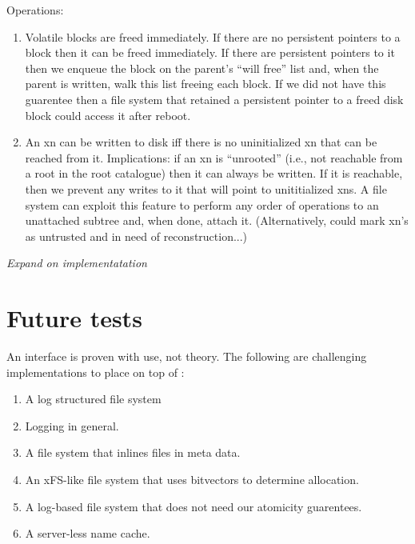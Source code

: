 Operations:
\begin{enumerate} 
	\item Volatile blocks are freed immediately.  If there are no
	persistent pointers to a block then it can be freed
	immediately.  If there are persistent pointers to it then we
	enqueue the block on the parent's  ``will free'' list  and,
	when the parent is written, walk this list freeing each block.
	If we did not have this guarentee then a file system that
	retained a persistent pointer to a freed disk block could
	access it after reboot.

	\item An xn can be written to disk iff there is no
	uninitialized xn that can be reached from it.  Implications:
	if an xn is ``unrooted'' (i.e., not reachable from a root in
	the root catalogue) then it can always be written.  If it is
	reachable, then we prevent any writes to it that will point to
	unititialized xns.  A file system can exploit this feature to
	perform any order of operations to an unattached subtree and,
	when done, attach it.  (Alternatively, could mark xn's as
	untrusted and in need of reconstruction...)

\end{enumerate}

{\em Expand on implementatation}

\section{Future tests}

	An interface is proven with use, not theory.  The following
are challenging implementations to place on top of \xxx :
\begin{enumerate}
      	\item A log structured file system

	\item Logging in general.

        \item A file system that inlines files in meta data.

        \item An xFS-like file system that uses bitvectors to
        determine allocation.

        \item A log-based file system that does not need our atomicity
        guarentees.

        \item A server-less name cache.
\end{enumerate}

